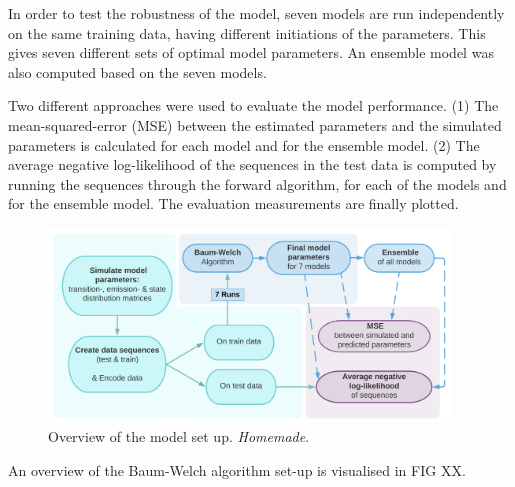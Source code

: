 In order to test the robustness of the model, seven models are run independently on the same training data, having different initiations of the parameters. This gives seven different sets of optimal model parameters. An ensemble model was also computed based on the seven models.

Two different approaches were used to evaluate the model performance. (1) The mean-squared-error (MSE) between the estimated parameters and the simulated parameters is calculated for each model and for the ensemble model. (2) The average negative log-likelihood of the sequences in the test data is computed by running the sequences through the forward algorithm, for each of the models and for the ensemble model. The evaluation measurements are finally plotted.

\begin{figure}[H]
    \centering
    \includegraphics[width = 0.95\textwidth]{fig/Overall_setup.png}
    \caption{Overview of the model set up. \textit{Homemade}.}
    \label{fig:set_up}
\end{figure}

An overview of the Baum-Welch algorithm set-up is visualised in FIG XX. 


